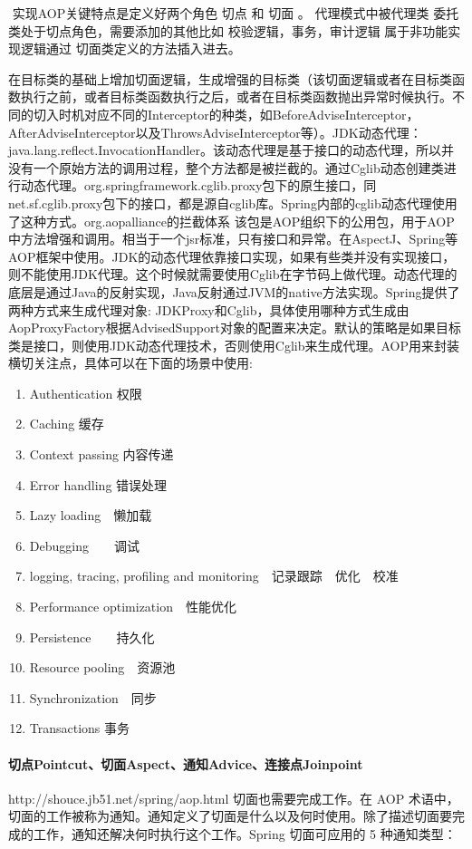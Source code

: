 \documentclass[../../../interview-questions.tex]{subfiles}
\begin{document}
​ 实现AOP关键特点是定义好两个角色 切点 和 切面 。 代理模式中被代理类 委托类处于切点角色，需要添加的其他比如 校验逻辑，事务，审计逻辑 属于非功能实现逻辑通过 切面类定义的方法插入进去。

在目标类的基础上增加切面逻辑，生成增强的目标类（该切面逻辑或者在目标类函数执行之前，或者目标类函数执行之后，或者在目标类函数抛出异常时候执行。不同的切入时机对应不同的Interceptor的种类，如BeforeAdviseInterceptor，AfterAdviseInterceptor以及ThrowsAdviseInterceptor等）。JDK动态代理：java.lang.reflect.InvocationHandler。该动态代理是基于接口的动态代理，所以并没有一个原始方法的调用过程，整个方法都是被拦截的。通过Cglib动态创建类进行动态代理。org.springframework.cglib.proxy包下的原生接口，同net.sf.cglib.proxy包下的接口，都是源自cglib库。Spring内部的cglib动态代理使用了这种方式。org.aopalliance的拦截体系
该包是AOP组织下的公用包，用于AOP中方法增强和调用。相当于一个jsr标准，只有接口和异常。在AspectJ、Spring等AOP框架中使用。JDK的动态代理依靠接口实现，如果有些类并没有实现接口，则不能使用JDK代理。这个时候就需要使用Cglib在字节码上做代理。动态代理的底层是通过Java的反射实现，Java反射通过JVM的native方法实现。Spring提供了两种方式来生成代理对象: JDKProxy和Cglib，具体使用哪种方式生成由AopProxyFactory根据AdvisedSupport对象的配置来决定。默认的策略是如果目标类是接口，则使用JDK动态代理技术，否则使用Cglib来生成代理。AOP用来封装横切关注点，具体可以在下面的场景中使用:

\begin{enumerate}
    \item {Authentication 权限}
    \item {Caching 缓存}
    \item {Context passing 内容传递}
    \item {Error handling 错误处理}
    \item {Lazy loading　懒加载}
    \item {Debugging　　调试}
    \item {logging, tracing, profiling and monitoring　记录跟踪　优化　校准}
    \item {Performance optimization　性能优化}
    \item {Persistence　　持久化}
    \item {Resource pooling　资源池}
    \item {Synchronization　同步}
    \item {Transactions 事务}
\end{enumerate}

\paragraph{切点Pointcut、切面Aspect、通知Advice、连接点Joinpoint}

http://shouce.jb51.net/spring/aop.html
切面也需要完成工作。在 AOP 术语中，切面的工作被称为通知。通知定义了切面是什么以及何时使用。除了描述切面要完成的工作，通知还解决何时执行这个工作。Spring 切面可应用的 5 种通知类型：
\end{document}
